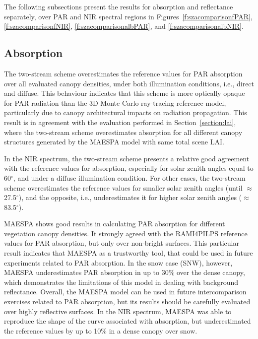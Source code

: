 \documentclass[a4paper,11pt]{report}
\begin{document}
The following subsections present the results for absorption and reflectance separately, over PAR and NIR spectral regions in Figures~\ref{f:szacomparisonfPAR}, \ref{f:szacomparisonfNIR}, \ref{f:szacomparisonalbPAR}, and \ref{f:szacomparisonalbNIR}.

\subsection{Absorption}

The two-stream scheme overestimates the reference values for PAR absorption over all evaluated canopy densities, under both illumination conditions, i.e., direct and diffuse. This behaviour indicates that this scheme is more optically opaque for PAR radiation than the 3D Monte Carlo ray-tracing reference model, particularly due to canopy architectural impacts on radiation propagation. This result is in agreement with the evaluation performed in Section~\ref{section:lai}, where the two-stream scheme overestimates absorption for all different canopy structures generated by the MAESPA model with same total scene LAI. 

In the NIR spectrum, the two-stream scheme presents a relative good agreement with the reference values for absorption, especially for solar zenith angles equal to 60$^{\circ}$, and under a diffuse illumination condition. For other cases, the two-stream scheme overestimates the reference values for smaller solar zenith angles (until $\approx$ 27.5$^{\circ}$), and the opposite, i.e., underestimates it for higher solar zenith angles ($\approx$ 83.5$^{\circ}$).

MAESPA shows good results in calculating PAR absorption for different vegetation canopy densities. It strongly agreed with the RAMI4PILPS reference values for PAR absorption, but only over non-bright surfaces. This particular result indicates that MAESPA as a trustworthy tool, that could be used in future experiments related to PAR absorption. In the snow case (SNW), however, MAESPA underestimates PAR absorption in up to 30\% over the dense canopy, which demonstrates the limitations of this model in dealing with background reflectance. Overall, the MAESPA model can be used in future intercomparison exercises related to PAR absorption, but its results should be carefully evaluated over highly reflective surfaces. In the NIR spectrum, MAESPA was able to reproduce the shape of the curve associated with absorption, but underestimated the reference values by up to 10\% in a dense canopy over snow.
\end{document}
